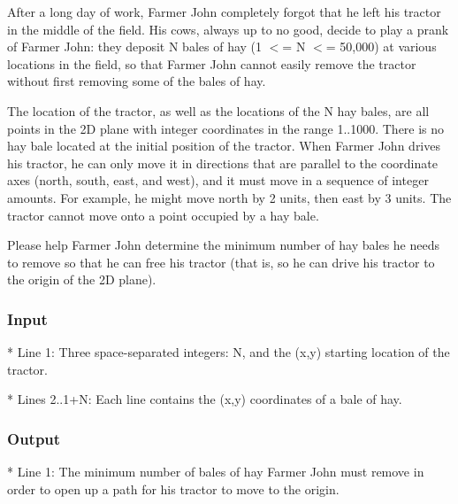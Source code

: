 

After a long day of work, Farmer John completely forgot that he left his tractor in the middle of the field.  His cows, always up to no good, decide to play a prank of Farmer John: they deposit N bales of hay (1 $<$= N $<$= 50,000) at various locations in the field, so that Farmer John cannot easily remove the tractor without first removing some of the bales of hay. 

The location of the tractor, as well as the locations of the N hay bales, are all points in the 2D plane with integer coordinates in the range 1..1000.  There is no hay bale located at the initial position of the tractor.  When Farmer John drives his tractor, he can only move it in directions that are parallel to the coordinate axes (north, south, east, and west), and it must move in a sequence of integer amounts.  For example, he might move north by 2 units, then east by 3 units.  The tractor cannot move onto a point occupied by a hay bale.

Please help Farmer John determine the minimum number of hay bales he needs to remove so that he can free his tractor (that is, so he can drive his tractor to the origin of the 2D plane).

\subsubsection{Input}

* Line 1: Three space-separated integers: N, and the (x,y) starting         location of the tractor.

* Lines 2..1+N: Each line contains the (x,y) coordinates of a bale of         hay.

\subsubsection{Output}

* Line 1: The minimum number of bales of hay Farmer John must remove         in order to open up a path for his tractor to move to the         origin.

